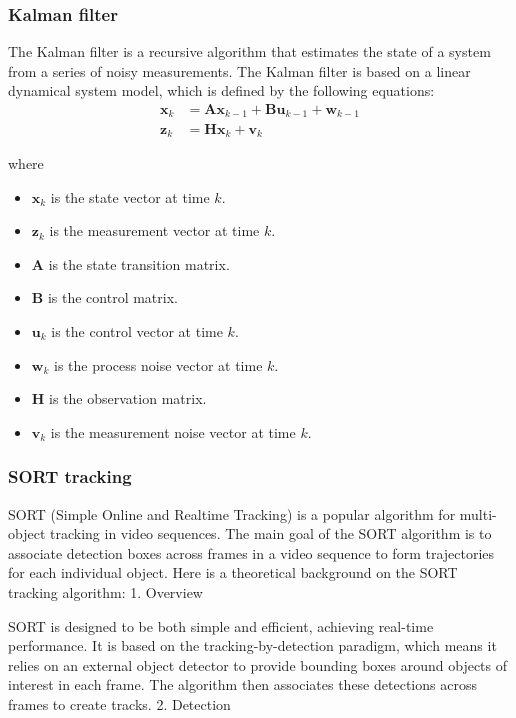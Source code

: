 \subsubsection{Kalman filter} \label{subsubsec:kalman_filter}
The Kalman filter is a recursive algorithm that estimates the state of a system from a series of noisy measurements. The Kalman filter is based on a linear dynamical system model, which is defined by the following equations:
\begin{equation}
  \begin{aligned}
    \mathbf{x}_k & = \mathbf{Ax}_{k - 1} + \mathbf{Bu}_{k - 1} + \mathbf{w}_{k - 1} \\
    \mathbf{z}_k & = \mathbf{Hx}_k + \mathbf{v}_k
  \end{aligned}
  \label{eq:kalman_filter}
\end{equation}

where

\begin{itemize}
  \item $\mathbf{x}_k$ is the state vector at time $k$.
  \item $\mathbf{z}_k$ is the measurement vector at time $k$.
  \item $\mathbf{A}$ is the state transition matrix.
  \item $\mathbf{B}$ is the control matrix.
  \item $\mathbf{u}_k$ is the control vector at time $k$.
  \item $\mathbf{w}_k$ is the process noise vector at time $k$.
  \item $\mathbf{H}$ is the observation matrix.
  \item $\mathbf{v}_k$ is the measurement noise vector at time $k$.
\end{itemize}


\subsubsection{SORT tracking} \label{subsubsec:sort_tracking}
SORT (Simple Online and Realtime Tracking) is a popular algorithm for multi-object tracking in video sequences. The main goal of the SORT algorithm is to associate detection boxes across frames in a video sequence to form trajectories for each individual object. Here is a theoretical background on the SORT tracking algorithm:
1. Overview

SORT is designed to be both simple and efficient, achieving real-time performance. It is based on the tracking-by-detection paradigm, which means it relies on an external object detector to provide bounding boxes around objects of interest in each frame. The algorithm then associates these detections across frames to create tracks.
2. Detection

